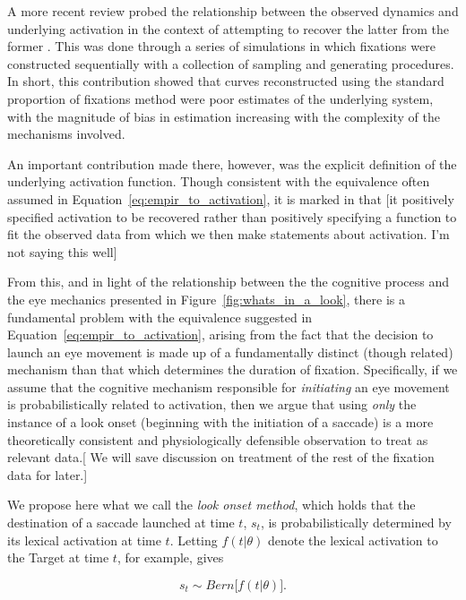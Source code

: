 A more recent review probed the relationship between the observed dynamics and underlying activation in the context of attempting to recover the latter from the former \cite{mcmurray2022m}. This was done through a series of simulations in which fixations were constructed sequentially with a collection of sampling and generating procedures. In short, this contribution showed that curves reconstructed using the standard proportion of fixations method were poor estimates of the underlying system, with the magnitude of bias in estimation increasing with the complexity of the mechanisms involved.

An important contribution made there, however, was the explicit definition of the underlying activation function. Though consistent with the equivalence often assumed in Equation~\ref{eq:empir_to_activation}, it is marked in that [it positively specified activation to be recovered rather than positively specifying a function to fit the observed data from which we then make statements about activation. I'm not saying this well]

From this, and in light of the relationship between the the cognitive process and the eye mechanics presented in Figure~\ref{fig:whats_in_a_look}, there is a fundamental problem with the equivalence suggested in Equation~\ref{eq:empir_to_activation}, arising from the fact that the decision to launch an eye movement is made up of a fundamentally distinct (though related) mechanism than that which determines the duration of fixation. Specifically, if we assume that the cognitive mechanism responsible for \textit{initiating} an eye movement is probabilistically related to activation, then we argue that using \textit{only} the instance of a look onset (beginning with the initiation of a saccade) is a more theoretically consistent and physiologically defensible observation to treat as relevant data.[ We will save discussion on treatment of the rest of the fixation data for later.]


We propose here what we call the \textit{look onset method}, which holds that the destination of a saccade launched at time $t$, $s_t$, is probabilistically determined by its lexical activation at time $t$. Letting $f(t|\theta)$ denote the lexical activation to the Target at time $t$, for example, gives

\begin{equation}\label{eq:onset_distribution}
s_t \sim Bern \big[ f( t  |  \theta) \big].
\end{equation}

